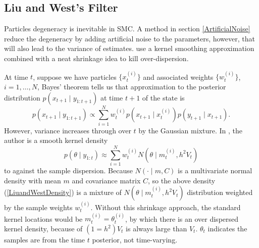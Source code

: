 





\subsection{Liu and West's Filter}

Particles degeneracy is inevitable in SMC. A method in section \ref{ArtificialNoise} reduce the degeneracy by adding artificial noise to the parameters, however, that will also lead to the variance of estimates. \cite{liu2001combined} use a kernel smoothing approximation combined with a neat shrinkage idea to kill over-dispersion. 

At time $t$, suppose we have particles $\{x_t^{(i)}\}$ and associated weights $\{w_t^{(i)}\}$, $i=1,\ldots,N$, Bayes' theorem tells us that approximation to the posterior distribution $p(x_{t+1}\mid y_{1:t+1})$ at time $t+1$ of the state is 
\begin{equation*}
p(x_{t+1} \mid y_{1:t+1}) \propto \sum_{i=1}^{N} w_t^{(i)} p(x_{t+1} \mid x_t^{(i)})p(y_{t+1}\mid x_{t+1}).
\end{equation*}
However, variance increases through over $t$ by the Gaussian mixture. In \cite{west1993mixture}, the author is a smooth kernel density 
\begin{equation}\label{LiuandWestDensity}
p(\theta\mid y_{1:t})\approx \sum_{i=1}^{N}w_t^{(i)} N(\theta\mid m_t^{(i)},h^2V_t)
\end{equation}
to against the sample dispersion. Because $N(\cdot\mid m,C)$ is a multivariate normal density with mean $m$ and covariance matrix $C$, so the above density (\ref{LiuandWestDensity}) is a mixture of $N(\theta\mid m_t^{(i)},h^2V_t)$ distribution weighted by the sample weights $w_t^{(i)}$. Without this shrinkage approach, the standard kernel locations would be $m_t^{(i)}=\theta_t^{(i)}$, by which there is an over dispersed kernel density, because of $(1=h^2)V_t$ is always large than $V_t$. $\theta_t$ indicates the samples are from the time $t$ posterior, not time-varying. 

